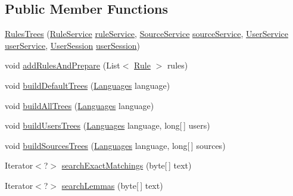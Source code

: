 \subsection*{Public Member Functions}
\begin{DoxyCompactItemize}
\item 
\hyperlink{classbr_1_1usp_1_1cata_1_1util_1_1_rules_trees_a9680a3e8b8e54372c4d9245671226b18}{Rules\+Trees} (\hyperlink{classbr_1_1usp_1_1cata_1_1service_1_1_rule_service}{Rule\+Service} \hyperlink{classbr_1_1usp_1_1cata_1_1util_1_1_rules_trees_a93fb83138e4ab0938c34e06d3eb3b48a}{rule\+Service}, \hyperlink{classbr_1_1usp_1_1cata_1_1service_1_1_source_service}{Source\+Service} \hyperlink{classbr_1_1usp_1_1cata_1_1util_1_1_rules_trees_a891861c5b386059c58675590a8878176}{source\+Service}, \hyperlink{classbr_1_1usp_1_1cata_1_1service_1_1_user_service}{User\+Service} \hyperlink{classbr_1_1usp_1_1cata_1_1util_1_1_rules_trees_acc11381172d0de06c7710395f7499844}{user\+Service}, \hyperlink{classbr_1_1usp_1_1cata_1_1web_1_1controller_1_1_user_session}{User\+Session} \hyperlink{classbr_1_1usp_1_1cata_1_1util_1_1_rules_trees_aae7be5fb6afb386509a5b91c91b8c559}{user\+Session})
\item 
void \hyperlink{classbr_1_1usp_1_1cata_1_1util_1_1_rules_trees_a6dd7c5c974d8a3e4390b69a47360e6e0}{add\+Rules\+And\+Prepare} (List$<$ \hyperlink{classbr_1_1usp_1_1cata_1_1model_1_1_rule}{Rule} $>$ rules)
\item 
void \hyperlink{classbr_1_1usp_1_1cata_1_1util_1_1_rules_trees_ac12f087aaff1ad3aec275117cf248eae}{build\+Default\+Trees} (\hyperlink{enumbr_1_1usp_1_1cata_1_1model_1_1_languages}{Languages} language)
\item 
void \hyperlink{classbr_1_1usp_1_1cata_1_1util_1_1_rules_trees_a193a548786d46646499a3331c51ac7ea}{build\+All\+Trees} (\hyperlink{enumbr_1_1usp_1_1cata_1_1model_1_1_languages}{Languages} language)
\item 
void \hyperlink{classbr_1_1usp_1_1cata_1_1util_1_1_rules_trees_ad20c458573e3135b9fe4e70dd88c8ce3}{build\+Users\+Trees} (\hyperlink{enumbr_1_1usp_1_1cata_1_1model_1_1_languages}{Languages} language, long\mbox{[}$\,$\mbox{]} users)
\item 
void \hyperlink{classbr_1_1usp_1_1cata_1_1util_1_1_rules_trees_a80945f70f909b21feb390335a31f88a7}{build\+Sources\+Trees} (\hyperlink{enumbr_1_1usp_1_1cata_1_1model_1_1_languages}{Languages} language, long\mbox{[}$\,$\mbox{]} sources)
\item 
Iterator$<$?$>$ \hyperlink{classbr_1_1usp_1_1cata_1_1util_1_1_rules_trees_a71edf3fe667d833d630e9c7a077572c9}{search\+Exact\+Matchings} (byte\mbox{[}$\,$\mbox{]} text)
\item 
Iterator$<$?$>$ \hyperlink{classbr_1_1usp_1_1cata_1_1util_1_1_rules_trees_a9bec6cddac112f3a87e1a53e512e9371}{search\+Lemmas} (byte\mbox{[}$\,$\mbox{]} text)
\end{DoxyCompactItemize}
